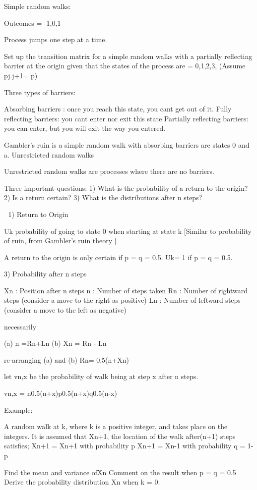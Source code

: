 Simple random walks: 

Outcomes ={ -1,0,1}

Process jumps one step at a time.

Set up the transition matrix for a simple random walks with a partially reflecting barrier at the origin given that the states of the 
process are ={ 0,1,2,3,} (Assume pj.j+1= p)

Three types of barriers:

Absorbing barriers : once you reach this state, you cant get out of it.
Fully reflecting barriers:  you cant enter nor exit this state
Partially reflecting barriers: you can enter, but you will exit the way you entered.

Gambler's ruin is a simple random walk with absorbing barriers are states 0 and a.
Unrestricted random walks

Unrestricted random walks are processes where there are no barriers.

Three important questions:
	1) What is the probability of a return to the origin?
	2) Is a return certain?
	3) What is the distributions after n steps?






1) Return to Origin

Uk	probability of going to state 0 when starting at state k 
	[Similar to probability of ruin, from Gambler's ruin theory ]

A return to the origin is only certain if p = q = 0.5.
Uk= 1 if p = q = 0.5.

3) Probability after n steps

Xn : Position after n steps
n   : Number of steps taken
Rn : Number of rightward steps (consider a move to the right as positive)
Ln : Number of leftward steps (consider a move to the left as negative)

	necessarily
	
	 (a) n =Rn+Ln		 (b) Xn = Rn - Ln 

re-arranging (a) and (b)   Rn= 0.5(n+Xn) 

let vn,x be the probability of walk being at step x after n steps.

vn,x =  n0.5(n+x)p0.5(n+x)q0.5(n-x)


Example: 

A random walk at k, where k is a positive integer, and takes place on the integers. It is assumed that Xn+1, the location of the walk after(n+1) steps satisfies;
	Xn+1 = Xn+1 with probability p
	Xn+1 = Xn-1 with probability q = 1-p

Find the mean and variance ofXn
Comment on the result when p = q = 0.5
Derive the probability distribution Xn when k = 0.

